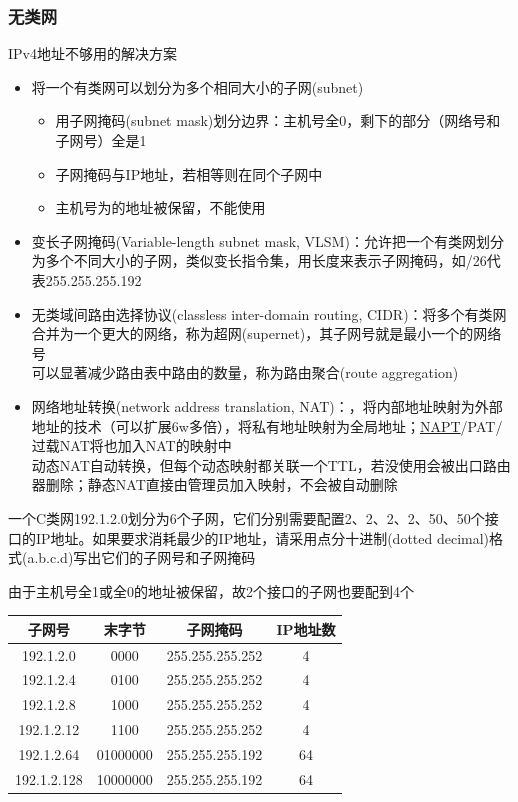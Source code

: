 \subsubsection{无类网}
IPv4地址不够用的解决方案
\begin{itemize}
	\item 将一个有类网可以划分为多个相同大小的子网(subnet)
	\begin{itemize}
		\item 用子网掩码(subnet mask)划分边界：主机号全0，剩下的部分（网络号和子网号）全是1
		\item 子网掩码与IP地址，若相等则在同个子网中
		\item 主机号为的地址被保留，不能使用
	\end{itemize}
	\item 变长子网掩码(Variable-length subnet mask, VLSM)：允许把一个有类网划分为多个不同大小的子网，类似变长指令集，用长度来表示子网掩码，如/26代表255.255.255.192
	\item 无类域间路由选择协议(classless inter-domain routing, CIDR)：将多个有类网合并为一个更大的网络，称为超网(supernet)，其子网号就是最小一个的网络号\\
可以显著减少路由表中路由的数量，称为路由聚合(route aggregation)
	\item 网络地址转换(network address translation, NAT)：，将内部地址映射为外部地址的技术（可以扩展6w多倍），将私有地址映射为全局地址；\underline{NAPT}/PAT/过载NAT将也加入NAT的映射中\\
动态NAT自动转换，但每个动态映射都关联一个TTL，若没使用会被出口路由器删除；静态NAT直接由管理员加入映射，不会被自动删除
\end{itemize}
\begin{example}
	一个C类网192.1.2.0划分为6个子网，它们分别需要配置2、2、2、2、50、50个接口的IP地址。如果要求消耗最少的IP地址，请采用点分十进制(dotted decimal)格式(a.b.c.d)写出它们的子网号和子网掩码
\end{example}
\begin{analysis}
	由于主机号全1或全0的地址被保留，故2个接口的子网也要配到4个
	\begin{center}
		\begin{tabular}{cccc}\hline
			子网号 & 末字节 & 子网掩码 & IP地址数\\\hline
			192.1.2.0 & 0000 & 255.255.255.252 & 4\\
			192.1.2.4 & 0100 & 255.255.255.252 & 4\\
			192.1.2.8 & 1000 & 255.255.255.252 & 4\\
			192.1.2.12 & 1100 & 255.255.255.252 & 4\\
			192.1.2.64 & 01000000 & 255.255.255.192 & 64\\
			192.1.2.128 & 10000000 & 255.255.255.192 & 64\\\hline
		\end{tabular}
	\end{center}
\end{analysis}

